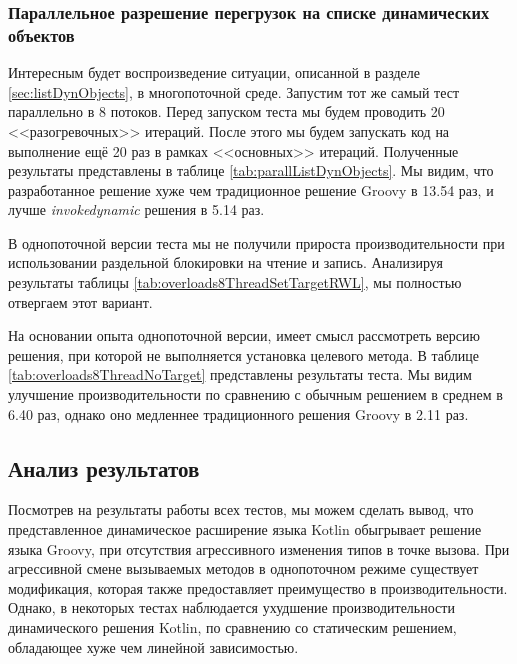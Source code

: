\subsubsection{Параллельное разрешение перегрузок на списке динамических объектов}

Интересным будет воспроизведение ситуации, описанной в разделе \ref{sec:listDynObjects}, в многопоточной среде. Запустим тот же самый тест параллельно в 8 потоков. Перед запуском теста мы будем проводить 20 <<разогревочных>> итераций. После этого мы будем запускать код на выполнение ещё 20 раз в рамках <<основных>> итераций. Полученные результаты представлены в таблице \ref{tab:parallListDynObjects}. Мы видим, что разработанное решение хуже чем традиционное решение Groovy в 13.54 раз, и лучше \textit{invokedynamic} решения в 5.14 раз.

В однопоточной версии теста мы не получили прироста производительности при использовании раздельной блокировки на чтение и запись. Анализируя результаты таблицы \ref{tab:overloads8ThreadSetTargetRWL}, мы полностью отвергаем этот вариант.

На основании опыта однопоточной версии, имеет смысл рассмотреть версию решения, при которой не выполняется установка целевого метода. В таблице \ref{tab:overloads8ThreadNoTarget} представлены результаты теста. Мы видим улучшение производительности по сравнению с обычным решением в среднем в 6.40 раз, однако оно медленнее традиционного решения Groovy в 2.11 раз.

\subsection{Анализ результатов}

Посмотрев на результаты работы всех тестов, мы можем сделать вывод, что представленное динамическое расширение языка Kotlin обыгрывает решение языка Groovy, при отсутствия агрессивного изменения типов в точке вызова. При агрессивной смене вызываемых методов в однопоточном режиме существует модификация, которая также предоставляет преимущество в производительности. Однако, в некоторых тестах наблюдается ухудшение производительности динамического решения Kotlin, по сравнению со статическим решением, обладающее хуже чем линейной зависимостью. 